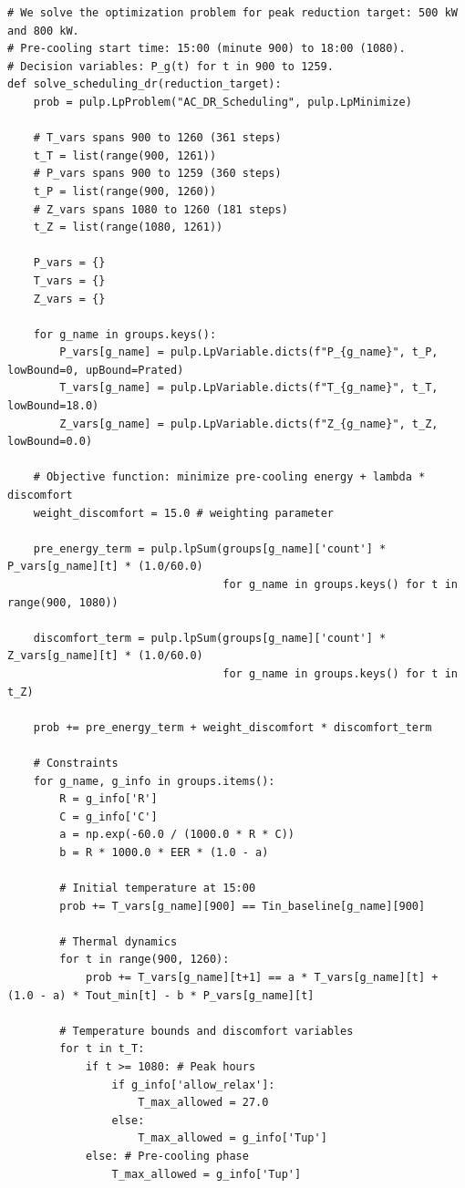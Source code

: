 \documentclass[12pt,a4paper]{article}
\begin{document}
\begin{lstlisting}
# We solve the optimization problem for peak reduction target: 500 kW and 800 kW.
# Pre-cooling start time: 15:00 (minute 900) to 18:00 (1080).
# Decision variables: P_g(t) for t in 900 to 1259.
def solve_scheduling_dr(reduction_target):
    prob = pulp.LpProblem("AC_DR_Scheduling", pulp.LpMinimize)
    
    # T_vars spans 900 to 1260 (361 steps)
    t_T = list(range(900, 1261))
    # P_vars spans 900 to 1259 (360 steps)
    t_P = list(range(900, 1260))
    # Z_vars spans 1080 to 1260 (181 steps)
    t_Z = list(range(1080, 1261))
    
    P_vars = {}
    T_vars = {}
    Z_vars = {}
    
    for g_name in groups.keys():
        P_vars[g_name] = pulp.LpVariable.dicts(f"P_{g_name}", t_P, lowBound=0, upBound=Prated)
        T_vars[g_name] = pulp.LpVariable.dicts(f"T_{g_name}", t_T, lowBound=18.0)
        Z_vars[g_name] = pulp.LpVariable.dicts(f"Z_{g_name}", t_Z, lowBound=0.0)
        
    # Objective function: minimize pre-cooling energy + lambda * discomfort
    weight_discomfort = 15.0 # weighting parameter
    
    pre_energy_term = pulp.lpSum(groups[g_name]['count'] * P_vars[g_name][t] * (1.0/60.0)
                                 for g_name in groups.keys() for t in range(900, 1080))
    
    discomfort_term = pulp.lpSum(groups[g_name]['count'] * Z_vars[g_name][t] * (1.0/60.0)
                                 for g_name in groups.keys() for t in t_Z)
    
    prob += pre_energy_term + weight_discomfort * discomfort_term
    
    # Constraints
    for g_name, g_info in groups.items():
        R = g_info['R']
        C = g_info['C']
        a = np.exp(-60.0 / (1000.0 * R * C))
        b = R * 1000.0 * EER * (1.0 - a)
        
        # Initial temperature at 15:00
        prob += T_vars[g_name][900] == Tin_baseline[g_name][900]
        
        # Thermal dynamics
        for t in range(900, 1260):
            prob += T_vars[g_name][t+1] == a * T_vars[g_name][t] + (1.0 - a) * Tout_min[t] - b * P_vars[g_name][t]
            
        # Temperature bounds and discomfort variables
        for t in t_T:
            if t >= 1080: # Peak hours
                if g_info['allow_relax']:
                    T_max_allowed = 27.0
                else:
                    T_max_allowed = g_info['Tup']
            else: # Pre-cooling phase
                T_max_allowed = g_info['Tup']
                

\end{lstlisting}
\end{document}

